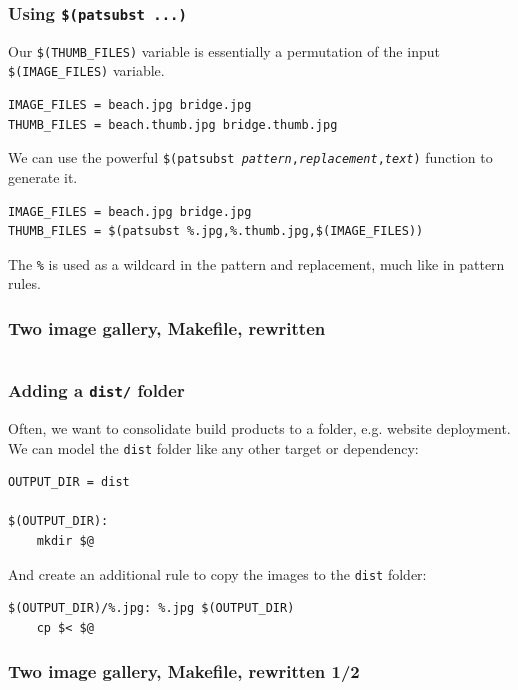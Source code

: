 \documentclass[xcolor=dvipsnames,t,compress]{beamer}
\begin{document}
\begin{frame}[fragile]
\frametitle{Using \texttt{\$(patsubst ...)}}
\vspace{-1em}
Our \texttt{\$(THUMB\_FILES)} variable is essentially a permutation of the input \texttt{\$(IMAGE\_FILES)} variable.
\begin{verbatim}
IMAGE_FILES = beach.jpg bridge.jpg
THUMB_FILES = beach.thumb.jpg bridge.thumb.jpg
\end{verbatim}
\pause
\vspace{1em}
We can use the powerful \texttt{\$(patsubst \textit{pattern},\textit{replacement},\textit{text})} function to generate it.
\begin{verbatim}
IMAGE_FILES = beach.jpg bridge.jpg
THUMB_FILES = $(patsubst %.jpg,%.thumb.jpg,$(IMAGE_FILES))
\end{verbatim}
The \texttt{\%} is used as a wildcard in the pattern and replacement, much like in pattern rules.
\end{frame}

\begin{frame}[fragile]
\frametitle{Two image gallery, Makefile, rewritten}
\vspace{-1em}
\inputminted[fontsize=\footnotesize,frame=single,tabsize=4]{make}{examples/make/Makefile.9}
\end{frame}

\begin{frame}[fragile]
\frametitle{Adding a \texttt{dist/} folder}
\vspace{-1em}
Often, we want to consolidate build products to a folder, e.g. website deployment. \\
\newline
We can model the \texttt{dist} folder like any other target or dependency:
\begin{verbatim}
OUTPUT_DIR = dist

$(OUTPUT_DIR):
	mkdir $@
\end{verbatim}
\vspace{1em}
And create an additional rule to copy the images to the \texttt{dist} folder:
\begin{verbatim}
$(OUTPUT_DIR)/%.jpg: %.jpg $(OUTPUT_DIR)
	cp $< $@
\end{verbatim}
\end{frame}

\begin{frame}[fragile]
\frametitle{Two image gallery, Makefile, rewritten 1/2}
\vspace{-1em}
\inputminted[fontsize=\small,frame=single,tabsize=4,firstline=1,lastline=12]{make}{examples/make/Makefile.10}
\end{frame}
\end{document}
